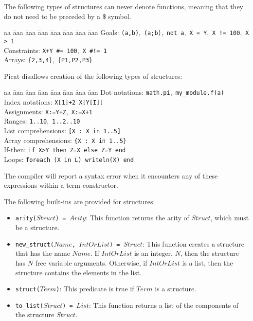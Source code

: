 The following types of structures can never denote functions, meaning that they do not need to be preceded by a \$ symbol.
\begin{tabbing}
aa \= aaa \= aaa \= aaa \=aaa \= aaa \= aaa \= aaa \kill
\> Goals:  \>  \> \> \> \> \> \texttt{(a,b)},\ \texttt{(a;b)},\ \texttt{not a},\ \texttt{X = Y},\ \verb-X != 100-,\ \verb+X > 1+ \\
\> Constraints:  \>  \> \> \> \> \> \verb-X+Y #= 100-,\ \verb+X #!= 1+ \\
\> Arrays:  \>  \> \> \> \> \> \verb+{2,3,4}+,\ \verb+{P1,P2,P3}+ \\
\end{tabbing}
Picat disallows creation of the following types of structures:
\begin{tabbing}
aa \= aaa \= aaa \= aaa \= aaa \= aaa \= aaa \= aaa \kill
\> Dot notations:  \>  \> \> \> \> \> \texttt{math.pi},\ \texttt{my\_module.f(a)} \\
\> Index notations:  \>  \> \> \> \> \> \texttt{X[1]+2}\, \texttt{X[Y[I]]} \\
\> Assignments:  \>  \> \> \> \> \> \texttt{X:=Y+Z},\ \texttt{X:=X+1} \\
\> Ranges:  \>  \> \> \> \> \> \texttt{1..10},\ \texttt{1..2..10} \\
\> List comprehensions:  \>  \> \> \> \> \> \texttt{[X : X in 1..5]} \\
\> Array comprehensions:  \>  \> \> \> \> \> \texttt{\{X : X in 1..5\}} \\
\> If-then:  \>  \> \> \> \> \> \texttt{if X>Y then Z=X else Z=Y end} \\
\> Loops:  \>  \> \> \> \> \> \texttt{foreach (X in L) writeln(X) end } 
\end{tabbing}
The compiler will report a syntax error when it encounters any of these expressions within a term constructor.

The following built-ins are provided for structures:
\begin{itemize}
\item \texttt{arity($Struct$) = $Arity$}: This function returns the arity of $Struct$, which must be a structure.
\item \texttt{new\_struct($Name$, $IntOrList$) = $Struct$}: This function creates a structure that has the name $Name$.  If $IntOrList$ is an integer, $N$, then the structure has $N$ free variable arguments.  Otherwise, if $IntOrList$ is a list, then the structure contains the elements in the list.  
\item \texttt{struct($Term$)}: This predicate is true if $Term$ is a structure.
\item \texttt{to\_list($Struct$) = $List$}: This function returns a list of the components of the structure $Struct$.
\end{itemize}

